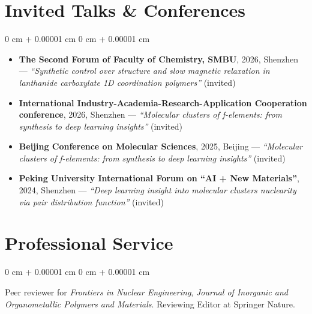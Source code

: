 \documentclass[10pt, letterpaper]{article}
\newenvironment{onecolentry}{
    \begin{adjustwidth}{
        0 cm + 0.00001 cm
    }{
        0 cm + 0.00001 cm
    }
}{
    \end{adjustwidth}
} %
\begin{document}
    \section{Invited Talks \& Conferences}
    \vspace{0.04 cm}
    \begin{onecolentry}
        \begin{itemize}
            \item \textbf{The Second Forum of Faculty of Chemistry, SMBU}, 2026, Shenzhen — \textit{``Synthetic control over structure and slow magnetic relaxation in lanthanide carboxylate 1D coordination polymers''} (invited)
            \item \textbf{International Industry-Academia-Research-Application Cooperation conference}, 2026, Shenzhen — \textit{``Molecular clusters of f-elements: from synthesis to deep learning insights''} (invited)
            \item \textbf{Beijing Conference on Molecular Sciences}, 2025, Beijing — \textit{``Molecular clusters of f-elements: from synthesis to deep learning insights''} (invited)
            \item \textbf{Peking University International Forum on ``AI + New Materials''}, 2024, Shenzhen — \textit{``Deep learning insight into molecular clusters nuclearity via pair distribution function''} (invited)
        \end{itemize}
    \end{onecolentry}

    \section{Professional Service}
    \vspace{0.04 cm}
    \begin{onecolentry}
    Peer reviewer for \textit{Frontiers in Nuclear Engineering}, \textit{Journal of Inorganic and Organometallic Polymers and Materials}.\newline
    Reviewing Editor at Springer Nature.
    \end{onecolentry}
\end{document}
